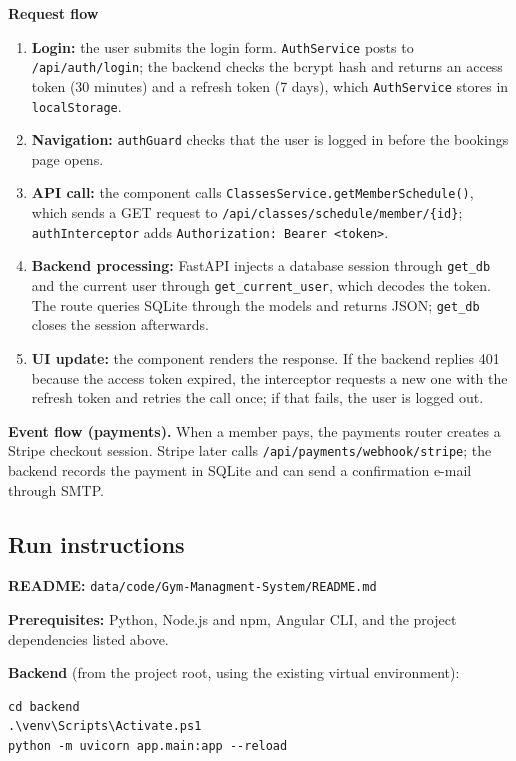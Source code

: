 \documentclass[11pt,a4paper]{article}
\newcommand{\fp}[1]{\nolinkurl{#1}}
\begin{document}
\textbf{Request flow}
\begin{enumerate}
\item \textbf{Login:} the user submits the login form. \texttt{AuthService} posts to \texttt{/api/auth/login}; the backend checks the bcrypt hash and returns an access token (30 minutes) and a refresh token (7 days), which \texttt{AuthService} stores in \texttt{localStorage}.
\item \textbf{Navigation:} \texttt{authGuard} checks that the user is logged in before the bookings page opens.
\item \textbf{API call:} the component calls \texttt{ClassesService.getMemberSchedule()}, which sends a GET request to \texttt{/api/classes/schedule/member/\{id\}}; \texttt{authInterceptor} adds \texttt{Authorization: Bearer <token>}.
\item \textbf{Backend processing:} FastAPI injects a database session through \texttt{get\_db} and the current user through \texttt{get\_current\_user}, which decodes the token. The route queries SQLite through the models and returns JSON; \texttt{get\_db} closes the session afterwards.
\item \textbf{UI update:} the component renders the response. If the backend replies 401 because the access token expired, the interceptor requests a new one with the refresh token and retries the call once; if that fails, the user is logged out.
\end{enumerate}

\textbf{Event flow (payments).} When a member pays, the payments router creates a Stripe checkout session. Stripe later calls \texttt{/api/payments/webhook/stripe}; the backend records the payment in SQLite and can send a confirmation e-mail through SMTP.

\subsection{Run instructions}

\textbf{README:} \fp{data/code/Gym-Managment-System/README.md}

\textbf{Prerequisites:} Python, Node.js and npm, Angular CLI, and the project dependencies listed above.

\textbf{Backend} (from the project root, using the existing virtual environment):
\begin{verbatim}
cd backend
.\venv\Scripts\Activate.ps1
python -m uvicorn app.main:app --reload
\end{verbatim}
\end{document}

